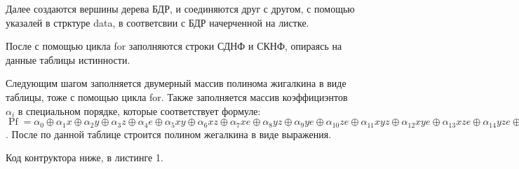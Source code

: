 \documentclass[10pt,a4paper,final]{article} %
\begin{document}
\par Далее создаются вершины дерева БДР, и соединяются друг с другом, с помощью указалей в стрктуре data, в соответсвии с БДР начерченной на листке.

\par После с помощью цикла for заполняются строки СДНФ и СКНФ, опираясь на данные таблицы истинности.

\par Следующим шагом заполняется двумерный массив полинома жигалкина в виде таблицы, тоже с помощью цикла for. Также заполняется массив коэффициэнтов $\alpha_i$ в специальном порядке, которые соответствует формуле: $\operatorname{Pf}=\alpha_0 \oplus\alpha_1x \oplus\alpha_2y \oplus\alpha_3z  \oplus\alpha_4e\oplus\alpha_5xy\oplus\alpha_6xz\oplus\alpha_7xe\oplus\alpha_8yz\oplus\alpha_9ye\oplus\alpha_{10}ze\oplus\alpha_{11}xyz\oplus\alpha_{12}xye\oplus\alpha_{13}xze\oplus\alpha_{14}yze\oplus\alpha_15xyze $. После по данной таблице строится полином жегалкина в виде выражения.
\par Код контруктора ниже, в листинге 1. 
\end{document}
